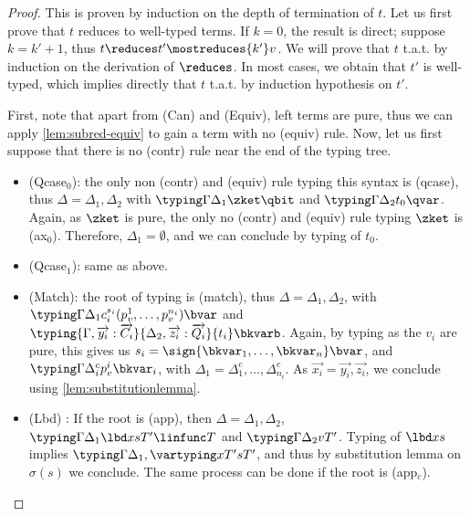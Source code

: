 \begin{proof}
  This is proven by induction on the depth of termination of $t$.
  Let us first prove that $t$ reduces to well-typed terms. If $k =
  0$, the result
  is direct; suppose $k = k' + 1$, thus $t \reduces t' \mostreduces{k'} v$.
  We will prove that $t$ t.a.t. by induction on the derivation
  of $\reduces$. In most cases, we obtain that $t'$ is
  well-typed, which implies directly that $t$ t.a.t. by
  induction hypothesis on $t'$.

  First, note that apart from (Can) and (Equiv), left terms are pure,
  thus we can apply \autoref{lem:subred-equiv} to gain a term with no
  (equiv) rule.
  Now, let us first suppose that there is no (contr) rule near the
  end of the typing tree.

  \begin{itemize}
    \item (Qcase$_0$): the only non (contr) and (equiv) rule typing
      this syntax is (qcase),
      thus $\Delta = \Delta_1, \Delta_2$ with $\typing \Gamma
      {\Delta_1} \zket \qbit$ and $\typing \Gamma {\Delta_2} {t_0} \qvar$.
      Again, as $\zket$ is pure, the only no (contr) and (equiv) rule
      typing $\zket$ is (ax$_0$).
      Therefore, $\Delta_1 = \emptyset$, and we can conclude by typing of $t_0$.

    \item (Qcase$_1$): same as above.

    \item (Match): the root of typing is (match), thus $\Delta =
      \Delta_1, \Delta_2$, with $\typing \Gamma {\Delta_1}
      {c_i^{s_i}(p_v^1, \dots, p_v^{n_i})} \bvar$
      and $\typing {\Gamma, \overrightarrow{y_i} :
      \overrightarrow{C_i}} {\Delta_2,
      \overrightarrow{z_i} : \overrightarrow{Q_i}} {t_i} \bkvarb$.
      Again, by typing as the $v_i$ are pure, this gives us $s_i = \sign
      {\bkvar_1, \dots, \bkvar_n} \bvar$, and $\typing \Gamma
      {\Delta_i^c} {p_v^i} \bkvar_i$,
      with $\Delta_1 = \Delta_1^c, \dots, \Delta_{n_i}^c$.
      As $\overrightarrow{x_i} = \overrightarrow{y_i},
      \overrightarrow{z_i}$, we conclude using
      \autoref{lem:substitutionlemma}.

    \item (Lbd) : If the root is (app), then $\Delta = \Delta_1,
      \Delta_2$, $\typing \Gamma {\Delta_1} {\lbd x s} T' \linfunc T$
      and $\typing \Gamma {\Delta_2} v T'$.
      Typing of $\lbd x s$ implies $\typing \Gamma {\Delta_1,
      \vartyping x T'} s T'$, and thus by substitution lemma on
      $\sigma(s)$ we conclude.
      The same process can be done if the root is (app$_c$).


\end{itemize}
\end{proof}
